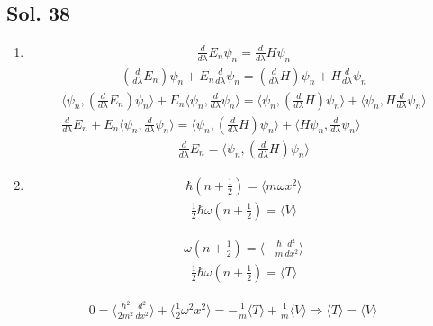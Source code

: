 \begin{enumerate}
\end{enumerate}

\subsection*{Sol. 38}
\begin{enumerate}
    \item 
    \begin{align*}
    \frac{d}{d\lambda}E_n\psi_n = \frac{d}{d\lambda}H\psi_n
\end{align*}
\begin{align*}
    (\frac{d}{d\lambda}E_n)\psi_n + E_n\frac{d}{d\lambda}\psi_n 
    =(\frac{d}{d\lambda}H)\psi_n + H\frac{d}{d\lambda}\psi_n 
\end{align*}
\begin{align*}
     \langle\psi_n, (\frac{d}{d\lambda}E_n)\psi_n\rangle +
     E_n\langle\psi_n,\frac{d}{d\lambda}\psi_n \rangle
    =\langle\psi_n,(\frac{d}{d\lambda}H)\psi_n\rangle
    + \langle\psi_n,H\frac{d}{d\lambda}\psi_n \rangle\\
    \frac{d}{d\lambda}E_n +
     E_n\langle\psi_n,\frac{d}{d\lambda}\psi_n \rangle
    =\langle\psi_n,(\frac{d}{d\lambda}H)\psi_n\rangle
    + \langle H\psi_n,\frac{d}{d\lambda}\psi_n \rangle
\end{align*}
\begin{align*}
    \frac{d}{d\lambda}E_n  = \langle\psi_n,(\frac{d}{d\lambda}H)\psi_n\rangle
\end{align*}
\item 
\begin{align*}
    \hbar(n+\frac{1}{2}) = \langle m\omega x^2\rangle
\end{align*}
\begin{align*}
    \frac{1}{2}\hbar\omega (n+\frac{1}{2}) = \langle V\rangle
\end{align*}

\begin{align*}
    \omega(n+\frac{1}{2}) = \langle-\frac{\hbar}{m}\frac{d^2}{dx^2}\rangle
\end{align*}
\begin{align*}
    \frac{1}{2}\hbar\omega (n+\frac{1}{2})=\langle T\rangle
\end{align*}
\end{enumerate}
\begin{align*}
    0 = \langle \frac{\hbar^2}{2m^2}\frac{d^2}{dx^2}\rangle + 
    \langle\frac{1}{2}\omega^2x^2\rangle=
    -\frac{1}{m}\langle T\rangle + \frac{1}{m}\langle V\rangle\Rightarrow \langle T\rangle = \langle V\rangle
\end{align*}


